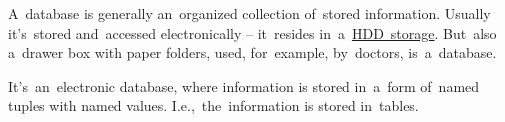 \label{databases}
\todo A~database is generally an~organized collection of~stored information.
Usually it's~stored and~accessed electronically -- it~resides in~a~\hyperref[harddiskdrive]{HDD~storage}.
But~also a~drawer box with paper folders, used, for~example, by~doctors, is~a~database.

\label{relationaldatabase}
It's~an~electronic database, where information is stored in~a~form of~named tuples with named values.
I.e.,~the~information is stored in~tables.

\label{hibernate}
